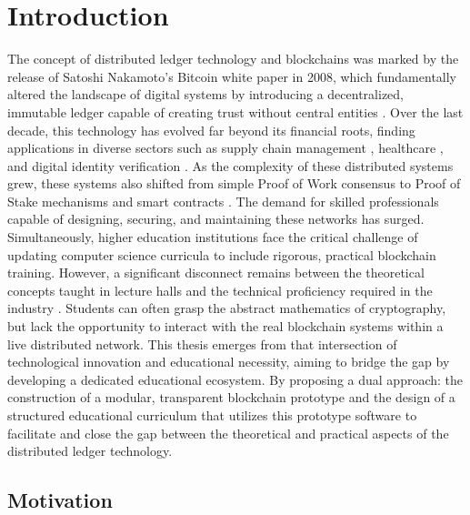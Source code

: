 \chapter*{Introduction} \label{ch1_introduction}

The concept of distributed ledger technology and blockchains was marked by the release of Satoshi Nakamoto’s Bitcoin white paper in 2008, which fundamentally altered the landscape of digital systems by introducing a decentralized, immutable ledger capable of creating trust without central entities \cite{nakamoto2008bitcoin}. Over the last decade, this technology has evolved far beyond its financial roots, finding applications in diverse sectors such as supply chain management \cite{rejeb2021logistics}, healthcare \cite{khezr2019healthcare}, and digital identity verification \cite{wang2020identity}. As the complexity of these distributed systems grew, these systems also shifted from simple Proof of Work consensus to Proof of Stake mechanisms \cite{king2012ppcoin} and smart contracts \cite{buterin2014ethereum}. The demand for skilled professionals capable of designing, securing, and maintaining these networks has surged. Simultaneously, higher education institutions face the critical challenge of updating computer science curricula to include rigorous, practical blockchain training. However, a significant disconnect remains between the theoretical concepts taught in lecture halls and the technical proficiency required in the industry \cite{duwadi2021education}. Students can often grasp the abstract mathematics of cryptography, but lack the opportunity to interact with the real blockchain systems within a live distributed network. This thesis emerges from that intersection of technological innovation and educational necessity, aiming to bridge the gap by developing a dedicated educational ecosystem. By proposing a dual approach: the construction of a modular, transparent blockchain prototype and the design of a structured educational curriculum that utilizes this prototype software to facilitate and close the gap between the theoretical and practical aspects of the distributed ledger technology.

\newpage
\section{Motivation} \label{ch1_motivation}

